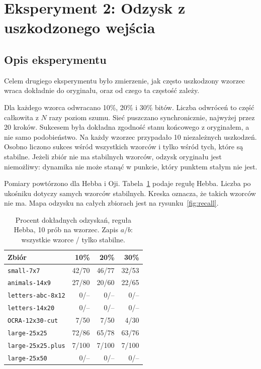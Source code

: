 \documentclass[11pt,a4paper]{article}
\begin{document}
\section{Eksperyment 2: Odzysk z uszkodzonego wejścia}
\label{sec:exp_recall}

\subsection{Opis eksperymentu}
Celem drugiego eksperymentu było zmierzenie, jak często uszkodzony wzorzec wraca dokładnie do oryginału, oraz od czego ta częstość zależy.

Dla każdego wzorca odwracano 10\%, 20\% i 30\% bitów. Liczba odwróceń to część całkowita z \(N\) razy poziom szumu. Sieć puszczano synchronicznie, najwyżej przez 20 kroków. Sukcesem była dokładna zgodność stanu końcowego z oryginałem, a nie samo podobieństwo. Na każdy wzorzec przypadało 10 niezależnych uszkodzeń. Osobno liczono sukces wśród wszystkich wzorców i tylko wśród tych, które są stabilne. Jeżeli zbiór nie ma stabilnych wzorców, odzysk oryginału jest niemożliwy: dynamika nie może stanąć w punkcie, który punktem stałym nie jest.

Pomiary powtórzono dla Hebba i Oji. Tabela~\ref{tab:recall} podaje regułę Hebba. Liczba po ukośniku dotyczy samych wzorców stabilnych. Kreska oznacza, że takich wzorców nie ma. Mapa odzysku na całych zbiorach jest na rysunku~\ref{fig:recall}.

\begin{table}[!htbp]
\centering
\caption{Procent dokładnych odzyskań, reguła Hebba, 10 prób na wzorzec. Zapis \(a/b\): wszystkie wzorce / tylko stabilne.}
\label{tab:recall}
\begin{tabular}{lrrr}
\toprule
Zbiór & 10\% & 20\% & 30\% \\
\midrule
\texttt{small-7x7}        & 42/70 & 46/77 & 32/53 \\
\texttt{animals-14x9}     & 27/80 & 20/60 & 22/65 \\
\texttt{letters-abc-8x12} &  0/-- &  0/-- &  0/-- \\
\texttt{letters-14x20}    &  0/-- &  0/-- &  0/-- \\
\texttt{OCRA-12x30-cut}   &  7/50 &  7/50 &  4/30 \\
\texttt{large-25x25}      & 72/86 & 65/78 & 63/76 \\
\texttt{large-25x25.plus} & 7/100 & 7/100 & 7/100 \\
\texttt{large-25x50}      &  0/-- &  0/-- &  0/-- \\
\bottomrule
\end{tabular}
\end{table}
\end{document}
